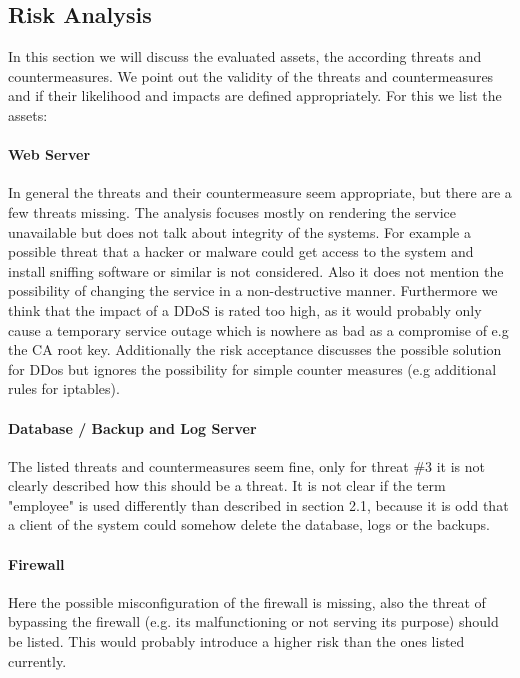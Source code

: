 \documentclass[english]{article}
\begin{document}

\subsection{Risk Analysis} %

%
%
In this section we will discuss the evaluated assets, the according threats and countermeasures. We point out the validity of the threats and countermeasures and if their likelihood and impacts are defined appropriately. For this we list the assets:

\paragraph{Web Server}
In general the threats and their countermeasure seem appropriate, but there are a few threats missing. The analysis focuses mostly on rendering the service unavailable but does not talk about integrity of the systems. For example a possible threat that a hacker or malware could get access to the system and install sniffing software or similar is not considered. Also it does not mention the possibility of changing the service in a non-destructive manner.
Furthermore we think that the impact of a DDoS is rated too high, as it would probably only cause a temporary service outage which is nowhere as bad as a compromise of e.g the CA root key. Additionally the risk acceptance discusses the possible solution for DDos but ignores the possibility for simple counter measures (e.g additional rules for iptables).

\paragraph{Database / Backup and Log Server}
The listed threats and countermeasures seem fine, only for threat \#3 it is not clearly described how this should be a threat. It is not clear if the term "employee" is used differently than described in section 2.1, because it is odd that a client of the system could somehow delete the database, logs or the backups.

\paragraph{Firewall}   
Here the possible misconfiguration of the firewall is missing, also the threat of bypassing the firewall (e.g. its malfunctioning or not serving its purpose) should be listed. This would probably introduce a higher risk than the ones listed currently.\\
\end{document}
